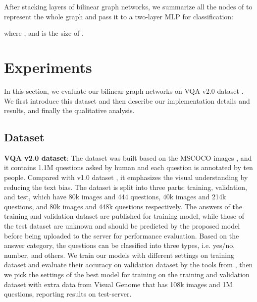 \documentclass[10pt,twocolumn,letterpaper]{article}
\begin{document}
After stacking  layers of bilinear graph networks, we summarize all the nodes of  to represent the whole graph and pass it to a two-layer MLP for classification:
\vspace{-5pt}

where , and  is the size of .

\section{Experiments}
In this section, we evaluate our bilinear graph networks on VQA v2.0 dataset \cite{antol2015vqa, goyal2017making}. We first introduce this dataset and then describe our implementation details and results, and finally the qualitative analysis. 

\subsection{Dataset}
\textbf{VQA v2.0 dataset}: The dataset was built based on the MSCOCO images \cite{lin2014microsoft}, and it contains 1.1M questions asked by human and each question is annotated by ten people. Compared with v1.0 dataset \cite{antol2015vqa}, it emphasizes the visual understanding by reducing the text bias. The dataset is split into three parts: training, validation, and test, which have 80k images and 444 questions, 40k images and 214k questions, and 80k images and 448k questions respectively. The answers of the training and validation dataset are published for training model, while those of the test dataset are unknown and should be predicted by the proposed model before being uploaded to the server for performance evaluation. Based on the answer category, the questions can be classified into three types, i.e. yes/no, number, and others. We train our models with different settings on training dataset and evaluate their accuracy on validation dataset by the tools from \cite{antol2015vqa}, then we pick the settings of the best model for training on the training and validation dataset with extra data from Visual Genome \cite{krishna2017visual} that has 108k images and 1M questions, reporting results on test-server.
	
\end{document}
